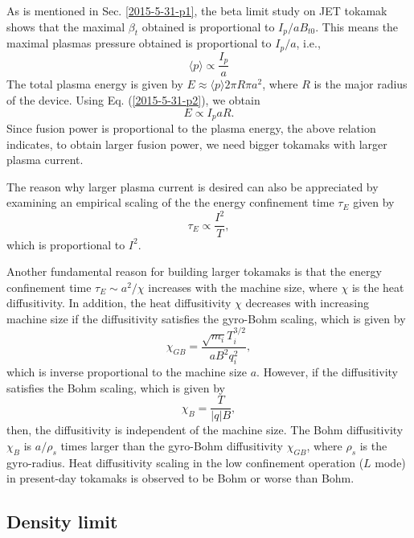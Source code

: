 \documentclass{llncs}
\begin{document}
As is mentioned in Sec. \ref{2015-5-31-p1}, the beta limit study on JET
tokamak shows that the maximal $\beta_t$ obtained is proportional to $I_p / a
B_{t 0}$. This means the maximal plasmas pressure obtained is proportional to
$I_p / a$, i.e.,
\begin{equation}
  \label{2015-5-31-p2} \langle p \rangle \propto \frac{I_p}{a}
\end{equation}
The total plasma energy is given by $E \approx \langle p \rangle 2 \pi R \pi
a^2$, where $R$ is the major radius of the device. Using Eq.
(\ref{2015-5-31-p2}), we obtain
\begin{equation}
  E \propto I_p a R.
\end{equation}
Since fusion power is proportional to the plasma energy, the above relation
indicates, to obtain larger fusion power, we need bigger tokamaks with larger
plasma current.

The reason why larger plasma current is desired can also be appreciated by
examining an empirical scaling of the the energy confinement time $\tau_E$
given by
\begin{equation}
  \tau_E \propto \frac{I^2}{T},
\end{equation}
which is proportional to $I^2$.

Another fundamental reason for building larger tokamaks is that the energy
confinement time $\tau_E \sim a^2 / \chi$ increases with the machine size,
where $\chi$ is the heat diffusitivity. In addition, the heat diffusitivity
$\chi$ decreases with increasing machine size if the diffusitivity satisfies
the gyro-Bohm scaling, which is given by
\begin{equation}
  \chi_{G B} = \frac{\sqrt{m_i} T_i^{3 / 2}}{a B^2 q^2_i},
\end{equation}
which is inverse proportional to the machine size $a$. However, if the
diffusitivity satisfies the Bohm scaling, which is given by
\begin{equation}
  \chi_B = \frac{T}{| q | B},
\end{equation}
then, the diffusitivity is independent of the machine size. The Bohm
diffusitivity $\chi_B$ is $a / \rho_s$ times larger than the gyro-Bohm
diffusitivity $\chi_{G B}$, where $\rho_s$ is the gyro-radius. Heat
diffusitivity scaling in the low confinement operation ($L$ mode) in
present-day tokamaks is observed to be Bohm or worse than Bohm.

\subsection{Density limit}
\end{document}
